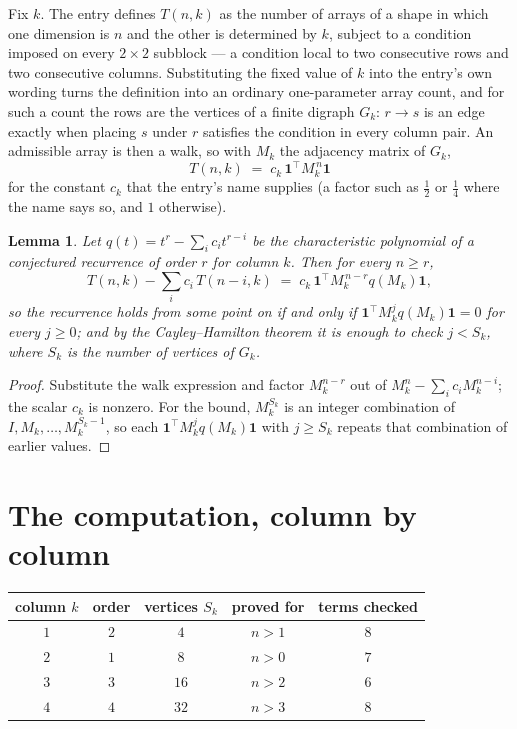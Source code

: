 \documentclass[11pt,a4paper]{article}
\theoremstyle{plain}
\newtheorem{lemma}[theorem]{Lemma}
\theoremstyle{definition}
\begin{document}
Fix $k$. The entry defines $T(n,k)$ as the number of arrays of a shape in which one dimension
is $n$ and the other is determined by $k$, subject to a condition imposed on every
$2\times2$ subblock --- a condition local to two consecutive rows and two consecutive columns.
Substituting the fixed value of $k$ into the entry's own wording turns the definition into an
ordinary one-parameter array count, and for such a count the rows are the vertices of a finite
digraph $G_k$: $r\to s$ is an edge exactly when placing $s$ under $r$ satisfies the condition
in every column pair. An admissible array is then a walk, so with $M_k$ the adjacency matrix
of $G_k$,
\[
T(n,k)\;=\;c_k\,\mathbf{1}^{\!\top}M_k^{\,n}\mathbf{1}
\]
for the constant $c_k$ that the entry's name supplies (a factor such as $\tfrac12$ or
$\tfrac14$ where the name says so, and $1$ otherwise).

\begin{lemma}\label{lem:crit}
Let $q(t)=t^{r}-\sum_i c_it^{r-i}$ be the characteristic polynomial of a conjectured
recurrence of order $r$ for column $k$. Then for every $n\ge r$,
\[
T(n,k)-\sum_i c_i\,T(n-i,k)\;=\;c_k\,\mathbf{1}^{\!\top}M_k^{\,n-r}q(M_k)\mathbf{1},
\]
so the recurrence holds from some point on if and only if
$\mathbf{1}^{\!\top}M_k^{j}q(M_k)\mathbf{1}=0$ for every $j\ge0$; and by the
Cayley--Hamilton theorem it is enough to check $j<S_k$, where $S_k$ is the number of vertices
of $G_k$.
\end{lemma}

\begin{proof}
Substitute the walk expression and factor $M_k^{n-r}$ out of $M_k^{n}-\sum_ic_iM_k^{n-i}$;
the scalar $c_k$ is nonzero. For the bound, $M_k^{S_k}$ is an integer combination of
$I,M_k,\dots,M_k^{S_k-1}$, so each $\mathbf{1}^{\!\top}M_k^{j}q(M_k)\mathbf{1}$ with
$j\ge S_k$ repeats that combination of earlier values.
\end{proof}

\section{The computation, column by column}

\begin{center}
\begin{tabular}{ccccc}
column $k$ & order & vertices $S_k$ & proved for & terms checked \\ \hline
$1$ & $2$ & $4$ & $n>1$ & $8$ \\
$2$ & $1$ & $8$ & $n>0$ & $7$ \\
$3$ & $3$ & $16$ & $n>2$ & $6$ \\
$4$ & $4$ & $32$ & $n>3$ & $8$ \\
\end{tabular}
\end{center}
\end{document}
